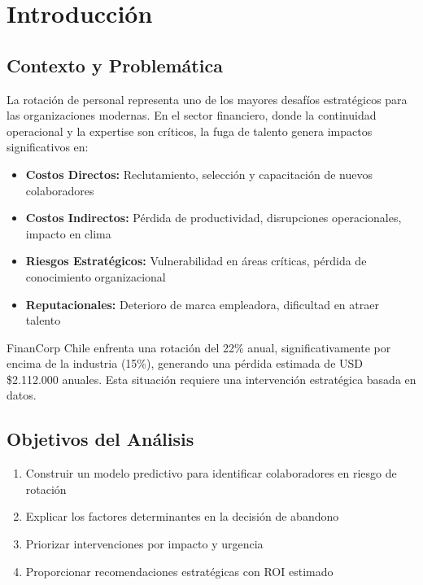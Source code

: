 \documentclass[11pt,a4paper,twoside]{article}
\begin{document}
\section{Introducción}

\subsection{Contexto y Problemática}

La rotación de personal representa uno de los mayores desafíos estratégicos para las organizaciones modernas. En el sector financiero, donde la continuidad operacional y la expertise son críticos, la fuga de talento genera impactos significativos en:

\begin{itemize}
    \item \textbf{Costos Directos:} Reclutamiento, selección y capacitación de nuevos colaboradores
    \item \textbf{Costos Indirectos:} Pérdida de productividad, disrupciones operacionales, impacto en clima
    \item \textbf{Riesgos Estratégicos:} Vulnerabilidad en áreas críticas, pérdida de conocimiento organizacional
    \item \textbf{Reputacionales:} Deterioro de marca empleadora, dificultad en atraer talento
\end{itemize}

FinanCorp Chile enfrenta una rotación del 22\% anual, significativamente por encima de la industria (15\%), generando una pérdida estimada de USD \$2.112.000 anuales. Esta situación requiere una intervención estratégica basada en datos.

\subsection{Objetivos del Análisis}

\begin{enumerate}
    \item Construir un modelo predictivo para identificar colaboradores en riesgo de rotación
    \item Explicar los factores determinantes en la decisión de abandono
    \item Priorizar intervenciones por impacto y urgencia
    \item Proporcionar recomendaciones estratégicas con ROI estimado
\end{enumerate}
\end{document}
